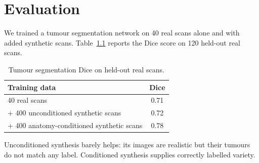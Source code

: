\chapter{Evaluation}
\label{ch:results}

We trained a tumour segmentation network on 40 real scans alone and with added synthetic scans.
Table~\ref{tab:dice} reports the Dice score on 120 held-out real scans.

\begin{table}[htbp]
  \centering
  \caption{Tumour segmentation Dice on held-out real scans.}
  \label{tab:dice}
  \begin{tabular}{lc}
    \toprule
    Training data & Dice \\
    \midrule
    40 real scans                                  & 0.71 \\
    + 400 unconditioned synthetic scans            & 0.72 \\
    + 400 anatomy-conditioned synthetic scans      & 0.78 \\
    \bottomrule
  \end{tabular}
\end{table}

Unconditioned synthesis barely helps: its images are realistic but their tumours do not match
any label. Conditioned synthesis supplies correctly labelled variety.
